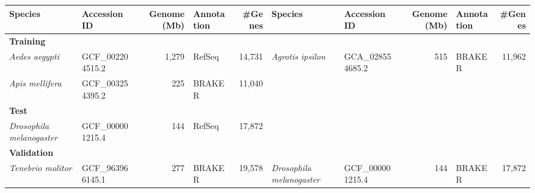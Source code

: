 \begin{table}[ht]
\begin{tabular}{llrlr|llrlr}
\hline
Species & Accession ID & Genome (Mb) & Annotation & \#Genes & Species & Accession ID & Genome (Mb) & Annotation & \#Genes \\
\hline
\multicolumn{10}{l}{\textbf{Training}} \\
\hline
\textit{Aedes aegypti} & GCF\_002204515.2 & 1,279 & RefSeq & 14,731 & \textit{Agrotis ipsilon} & GCA\_028554685.2 & 515 & BRAKER & 11,962 \\
\textit{Apis mellifera} & GCF\_003254395.2 & 225 & BRAKER & 11,040 &  &  &  &  &  \\
\hline
\multicolumn{10}{l}{\textbf{Test}} \\
\hline
\textit{Drosophila melanogaster} & GCF\_000001215.4 & 144 & RefSeq & 17,872 &  &  &  &  &  \\
\hline
\multicolumn{10}{l}{\textbf{Validation}} \\
\hline
\textit{Tenebrio molitor} & GCF\_963966145.1 & 277 & BRAKER & 19,578 & \textit{Drosophila melanogaster} & GCF\_000001215.4 & 144 & BRAKER & 17,872 \\
\hline
\end{tabular}
\end{table}
